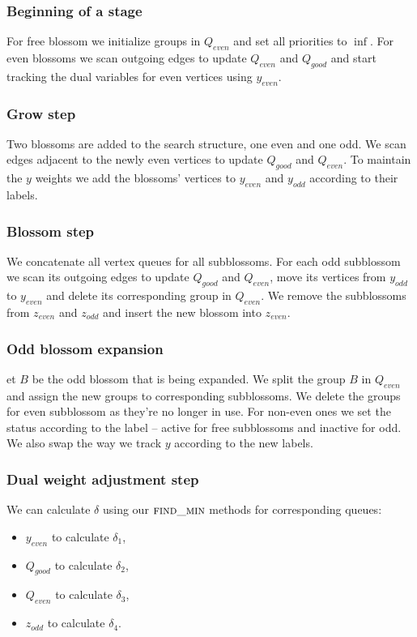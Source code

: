 \subsubsection*{Beginning of a stage}
For free blossom we initialize groups in $Q_{even}$ and set all priorities to $\inf$. For even blossoms we  scan outgoing edges to update $Q_{even}$ and $Q_{good}$ and start tracking the dual variables for even vertices using $y_{even}$.

\subsubsection*{Grow step}
Two blossoms are added to the search structure, one even and one odd. We scan edges adjacent to the newly even vertices to update $Q_{good}$ and $Q_{even}$. To maintain the $y$ weights we add the blossoms' vertices to $y_{even}$ and $y_{odd}$ according to their labels.

\subsubsection*{Blossom step}
We concatenate all vertex queues for all subblossoms. For each odd subblossom we scan its outgoing edges to update $Q_{good}$ and $Q_{even}$, move its vertices from $y_{odd}$ to $y_{even}$ and delete its corresponding group in $Q_{even}$. We remove the subblossoms from $z_{even}$ and $z_{odd}$ and insert the new blossom into $z_{even}$.

\subsubsection*{Odd blossom expansion}
et $B$ be the odd blossom that is being expanded. We split the group $B$ in $Q_{even}$ and assign the new groups to corresponding subblossoms. We delete the groups for even subblossom as they're no longer in use. For non-even ones we set the status according to the label – active for free subblossoms and inactive for odd. We also swap the way we track $y$ according to the new labels.

\subsubsection*{Dual weight adjustment step} We can calculate $\delta$ using our $\textsc{find\_min}$ methods for corresponding queues: 
\begin{itemize}
    \item $y_{even}$ to calculate $\delta_1$,
    \item $Q_{good}$ to calculate $\delta_2$,
    \item $Q_{even}$ to calculate $\delta_3$,
    \item $z_{odd}$ to calculate $\delta_4$.
\end{itemize}

